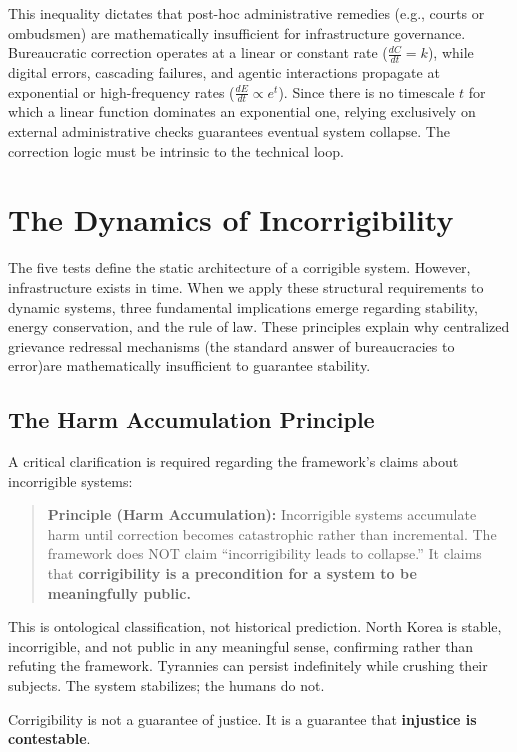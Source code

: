 This inequality dictates that post-hoc administrative remedies (e.g., courts or ombudsmen) are mathematically insufficient for infrastructure governance. Bureaucratic correction operates at a linear or constant rate ($\frac{dC}{dt} = k$), while digital errors, cascading failures, and agentic interactions propagate at exponential or high-frequency rates ($\frac{dE}{dt} \propto e^{t}$). Since there is no timescale $t$ for which a linear function dominates an exponential one, relying exclusively on external administrative checks guarantees eventual system collapse. The correction logic must be intrinsic to the technical loop.

\section{The Dynamics of Incorrigibility}
\label{sec:dynamics}

The five tests define the static architecture of a corrigible system. However, infrastructure exists in time. When we apply these structural requirements to dynamic systems, three fundamental implications emerge regarding stability, energy conservation, and the rule of law. These principles explain why centralized grievance redressal mechanisms (the standard answer of bureaucracies to error)are mathematically insufficient to guarantee stability.

\subsection{The Harm Accumulation Principle}

A critical clarification is required regarding the framework's claims about incorrigible systems:

\begin{quote}
\textbf{Principle (Harm Accumulation):} Incorrigible systems accumulate harm until correction becomes catastrophic rather than incremental. The framework does NOT claim ``incorrigibility leads to collapse.'' It claims that \textbf{corrigibility is a precondition for a system to be meaningfully public.}
\end{quote}

This is ontological classification, not historical prediction. North Korea is stable, incorrigible, and not public in any meaningful sense, confirming rather than refuting the framework. Tyrannies can persist indefinitely while crushing their subjects. The system stabilizes; the humans do not.

\begin{clarification}[title=The Core Claim]
Corrigibility is not a guarantee of justice. It is a guarantee that \textbf{injustice is contestable}.
\end{clarification}

